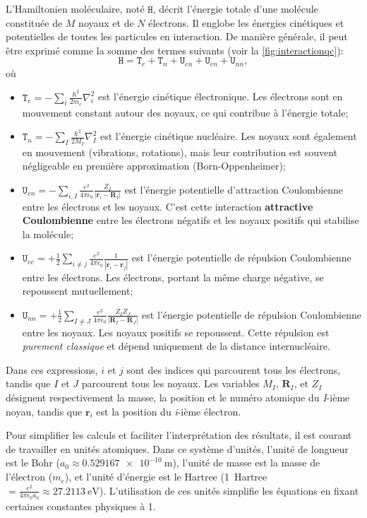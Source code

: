 \documentclass[12pt,a4paper]{article} %
\numberwithin{equation}{section} %
\numberwithin{figure}{section} %
\numberwithin{table}{section} %
\begin{document}
L'Hamiltonien moléculaire, noté $\mathtt{H}$, décrit l'énergie totale d'une molécule constituée de $M$ noyaux et de $N$ électrons. Il englobe les énergies cinétiques et potentielles de toutes les particules en interaction. De manière générale, il peut être exprimé comme la somme des termes suivants (voir la \autoref{fig:interactionqc}):
\begin{equation}
\mathtt{H}=\mathtt{T}_e+\mathtt{T}_n+\mathtt{U}_{en}+\mathtt{U}_{en}+\mathtt{U}_{nn},
\end{equation}
où
\begin{itemize}
\item $\mathtt{T}_e= -\sum_i\frac{\hbar^2}{2m_e}\nabla^2_i$ est l'énergie cinétique électronique. Les électrons sont en mouvement constant autour des noyaux, ce qui contribue à l'énergie totale; 
\item $\mathtt{T}_n=-\sum_I\frac{\hbar^2}{2M_I}\nabla^2_I$ est l'énergie cinétique nucléaire. Les noyaux sont également en mouvement (vibrations, rotations), mais leur contribution est souvent négligeable en première approximation (Born-Oppenheimer); 
\item $\mathtt{U}_{en}= -\sum_{i,I}\frac{e^2}{4\pi\epsilon_0}\frac{Z_I}{|\mathbf{r}_i-\mathbf{R}_I|}$ est l'énergie potentielle d'attraction Coulombienne entre les électrons et les noyaux. C'est cette interaction \textbf{attractive Coulombienne} entre les électrons négatifs et les noyaux positifs qui stabilise la molécule;
\item $\mathtt{U}_{ee}=+\frac{1}{2}\sum_{i\neq j}\frac{e^2}{4\pi\epsilon_0}\frac{1}{|\mathbf{r}_i-\mathbf{r}_j|}$ est l'énergie potentielle de répulsion Coulombienne entre les électrons. Les électrons, portant la même charge négative, se repoussent mutuellement;
\item $\mathtt{U}_{nn}=+\frac{1}{2}\sum_{I\neq J}\frac{e^2}{4\pi\epsilon_0}\frac{Z_IZ_J}{|\mathbf{R}_I-\mathbf{R}_J|}$ est l'énergie potentielle de répulsion Coulombienne entre les noyaux.  Les noyaux positifs se repoussent. Cette répulsion est \textit{purement classique} et dépend uniquement de la distance internucléaire.
\end{itemize}
Dans ces expressions, $i$ et $j$ sont des indices qui parcourent tous les électrons, tandis que $I$ et $J$ parcourent tous les noyaux. Les variables $M_I$, $\mathbf{R}_I$, et $Z_I$ désignent respectivement la masse, la position et le numéro atomique du \emph{I}-ième noyau, tandis que $\mathbf{r}_i$ est la position du \emph{i}-ième électron.

Pour simplifier les calculs et faciliter l'interprétation des résultats, il est courant de travailler en unités atomiques. Dans ce système d'unités, l'unité de longueur est le Bohr ($a_0 \approx \SI{0.529167e-10}{\meter}$), l'unité de masse est la masse de l'électron ($m_e$), et l'unité d'énergie est le Hartree (\SI{1}{Hartree} $= \frac{e^2}{4\pi\epsilon_0 a_0} \approx \SI{27.2113}{\electronvolt}$). L'utilisation de ces unités simplifie les équations en fixant certaines constantes physiques à 1.
\end{document}
